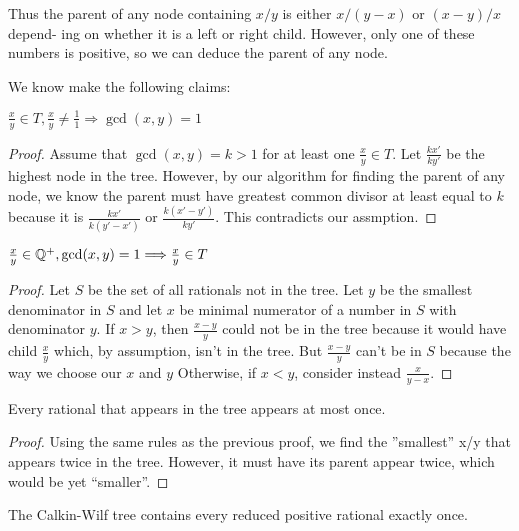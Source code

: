 Thus the parent of any node containing $x / y$ is either $x / (y-x)$ or $(x-y) / x$ depend-
ing on whether it is a left or right child. However, only one of these numbers is
positive, so we can deduce the parent of any node.

We know make the following claims:
\begin{theorem}
    $\frac x y \in T, \frac xy \neq \frac 1 1 \Longrightarrow \gcd(x, y) = 1$
\end{theorem}
\begin{proof}
    Assume that $\gcd(x, y) = k > 1$ for at least one $\frac x y \in T$. 
    Let $\frac{k x'}{k y'}$ be the highest node in the tree. However, 
    by our algorithm for finding the parent of any node, we know the parent
    must have greatest common divisor at least equal to $k$ because it is 
    $\frac{kx'}{k(y' - x')}$ or $\frac{k(x' - y')}{ky'}$. This contradicts our assmption.
\end{proof}

\begin{theorem}
    $\frac x y \in \mathbb{Q}^+, \gcd(x, y)= 1 \Longrightarrow \frac x y \in T$
\end{theorem}
\begin{proof}
    Let $S$ be the set of all rationals not in the tree. Let $y$ be the smallest denominator in $S$
    and let $x$ be minimal numerator of a number in $S$ with denominator
$y$. If $x > y$, then $\frac{x-y} y$ could not be in the tree because it would have child 
$\frac x y$ which, by assumption, isn't in the tree. But $\frac{x-y}y$ can't be in $S$ because
the way we choose our $x$ and $y$ Otherwise, if $x < y$, consider instead $\frac x{y-x}$. 

\end{proof}
\begin{theorem}
    Every rational that appears in the tree appears at most once. 
\end{theorem}
\begin{proof}
    Using the same rules as the previous proof, we ﬁnd the ”smallest” x/y
that appears twice in the tree. However, it must have its parent appear twice,
which would be yet ``smaller''.
\end{proof}

\begin{theorem}
   The Calkin-Wilf tree contains every reduced positive rational exactly once.
\end{theorem}

